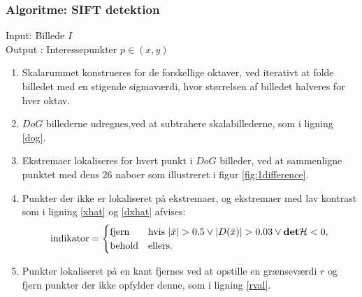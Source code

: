 \subsubsection*{Algoritme: SIFT detektion}
\begin{tabbing}
Input\quad \= : \= Billede $I$\\
Output \text{ } \> : \> Interessepunkter $p \in (x,y)$
\end{tabbing}
\begin{enumerate}
\item{Skalarummet konstrueres for de forskellige oktaver, ved iterativt at folde billedet med en stigende sigmaværdi, hvor størrelsen af billedet halveres for hver oktav.}
\item{$DoG$ billederne udregnes,ved at subtrahere skalabillederne, som i ligning \eqref{dog}.}
\item{Ekstremaer lokaliseres for hvert punkt i $DoG$ billeder, ved at sammenligne punktet med dens 26 naboer som illustreret i figur \ref{fig:1difference}.}
\item{Punkter der ikke er lokaliseret på ekstremaer, og ekstremaer med lav kontrast som i ligning \eqref{xhat} og \eqref{dxhat} afvises:
\begin{equation}
\begin{split}
\text{indikator} = 
\begin{cases}
\text{fjern}& \text{hvis } |\hat{x}|>0.5 \lor |D(\hat{x})|>0.03 \lor \bold{det} \mathcal{H}<0 , \\
\text{behold}& \text{ellers}. 
\end{cases}
\end{split}
\label{maxsurp}
\end{equation}
}
\item{Punkter lokaliseret på en kant fjernes ved at opstille en grænseværdi $r$ og fjern punkter der ikke opfylder denne, som i ligning \eqref{rval}.}
\end{enumerate}